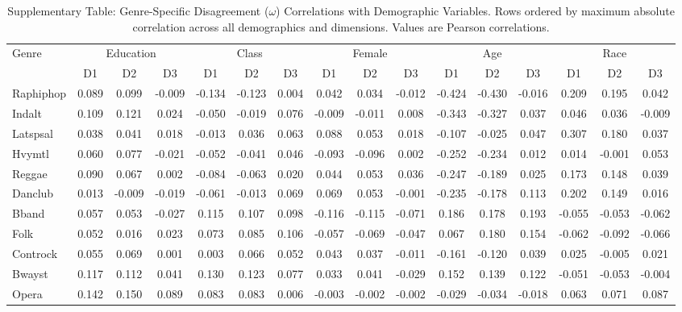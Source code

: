 
\begin{table}[htbp]
\centering
\footnotesize
\setlength{\tabcolsep}{3pt}
\caption{Supplementary Table: Genre-Specific Disagreement (\(\omega\)) Correlations with Demographic Variables. Rows ordered by maximum absolute correlation across all demographics and dimensions. Values are Pearson correlations.}
\label{tab:omega-demographics}
\begin{tabularx}{\textwidth}{@{}l|ccc|ccc|ccc|ccc|ccc@{}}
\toprule
\multirow{2}{*}{Genre} & \multicolumn{3}{c|}{Education} & \multicolumn{3}{c|}{Class} & \multicolumn{3}{c|}{Female} & \multicolumn{3}{c|}{Age} & \multicolumn{3}{c}{Race} \\
& D1 & D2 & D3 & D1 & D2 & D3 & D1 & D2 & D3 & D1 & D2 & D3 & D1 & D2 & D3 \\
\midrule
Raphiphop & 0.089 & 0.099 & -0.009 & -0.134 & -0.123 & 0.004 & 0.042 & 0.034 & -0.012 & -0.424 & -0.430 & -0.016 & 0.209 & 0.195 & 0.042 \\
Indalt & 0.109 & 0.121 & 0.024 & -0.050 & -0.019 & 0.076 & -0.009 & -0.011 & 0.008 & -0.343 & -0.327 & 0.037 & 0.046 & 0.036 & -0.009 \\
Latspsal & 0.038 & 0.041 & 0.018 & -0.013 & 0.036 & 0.063 & 0.088 & 0.053 & 0.018 & -0.107 & -0.025 & 0.047 & 0.307 & 0.180 & 0.037 \\
Hvymtl & 0.060 & 0.077 & -0.021 & -0.052 & -0.041 & 0.046 & -0.093 & -0.096 & 0.002 & -0.252 & -0.234 & 0.012 & 0.014 & -0.001 & 0.053 \\
Reggae & 0.090 & 0.067 & 0.002 & -0.084 & -0.063 & 0.020 & 0.044 & 0.053 & 0.036 & -0.247 & -0.189 & 0.025 & 0.173 & 0.148 & 0.039 \\
Danclub & 0.013 & -0.009 & -0.019 & -0.061 & -0.013 & 0.069 & 0.069 & 0.053 & -0.001 & -0.235 & -0.178 & 0.113 & 0.202 & 0.149 & 0.016 \\
Bband & 0.057 & 0.053 & -0.027 & 0.115 & 0.107 & 0.098 & -0.116 & -0.115 & -0.071 & 0.186 & 0.178 & 0.193 & -0.055 & -0.053 & -0.062 \\
Folk & 0.052 & 0.016 & 0.023 & 0.073 & 0.085 & 0.106 & -0.057 & -0.069 & -0.047 & 0.067 & 0.180 & 0.154 & -0.062 & -0.092 & -0.066 \\
Controck & 0.055 & 0.069 & 0.001 & 0.003 & 0.066 & 0.052 & 0.043 & 0.037 & -0.011 & -0.161 & -0.120 & 0.039 & 0.025 & -0.005 & 0.021 \\
Bwayst & 0.117 & 0.112 & 0.041 & 0.130 & 0.123 & 0.077 & 0.033 & 0.041 & -0.029 & 0.152 & 0.139 & 0.122 & -0.051 & -0.053 & -0.004 \\
Opera & 0.142 & 0.150 & 0.089 & 0.083 & 0.083 & 0.006 & -0.003 & -0.002 & -0.002 & -0.029 & -0.034 & -0.018 & 0.063 & 0.071 & 0.087 \\

\end{tabularx}
\end{table}
